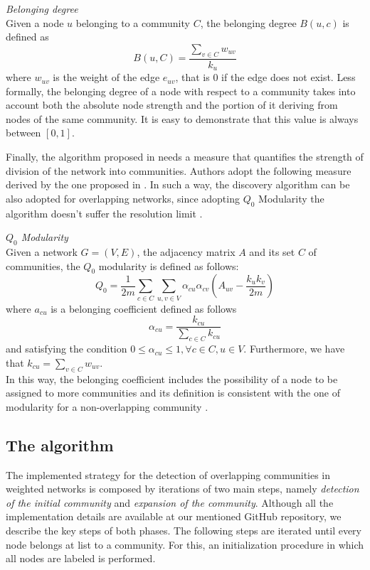\documentclass[sigchi]{acmart}
\begin{document}
\begin{definition}
\textit{Belonging degree} \\
Given a node $u$ belonging to a community $C$, the belonging degree $B(u, c)$ is defined as
$$ B(u, C) = \frac{\sum_{v \in C} w_{uv}}{k_u}$$
where $w_{uv}$ is the weight of the edge $e_{uv}$, that is 0 if the edge does not exist. Less formally, the belonging degree of a node with respect to a community takes into account both the absolute node strength and the portion of it deriving from nodes of the same community. It is easy to demonstrate that this value is always between $[0, 1]$. 
\end{definition}

Finally, the algorithm proposed in \cite{2010PhyA..389.4177C} needs a measure that quantifies the strength of division of the network into communities. Authors adopt the following measure derived by the one proposed in \cite{modularity}. In such a way, the discovery algorithm can be also adopted for overlapping networks, since adopting $Q_0$ Modularity the algorithm doesn't suffer the resolution limit \cite{Fortunato2007ResolutionLI}.

\begin{definition}\label{def:modularity}
\textit{$Q_0$ Modularity} \\
Given a network $G=(V, E)$, the adjacency matrix $A$ and its set $C$ of communities, the $Q_0$ modularity is defined as follows: 
$$ Q_0 = \frac{1}{2m} \sum_{c \in C} \sum_{u,v \in V} \alpha_{cu} \alpha_{cv} \left( A_{uv} - \frac{k_u k_v}{2m} \right) $$
where $a_{cu}$ is a belonging coefficient defined as follows 
$$ \alpha_{cu} = \frac{k_{cu}}{\sum_{c \in C} k_{cu}}$$ and satisfying the condition $0 \le \alpha_{cu} \le 1,  \forall c \in C, u \in V $. Furthermore, we have that 
$k_{cu} = \sum_{v \in C} w_{uv}$. \\
In this way, the belonging coefficient includes the possibility of a node to be assigned to more communities and its definition is consistent with the one of modularity for a non-overlapping community \cite{modularity}.
\end{definition}

\subsection{The algorithm}
The implemented strategy for the detection of overlapping communities in weighted networks is composed by iterations of two  main steps, namely \textit{detection of the initial community} and \textit{expansion of the community}. Although all the implementation details are available at our mentioned GitHub repository, we describe the key steps of both phases. The following steps are iterated until every node belongs at list to a community. For this, an initialization procedure in which all nodes are labeled is performed.
\end{document}
